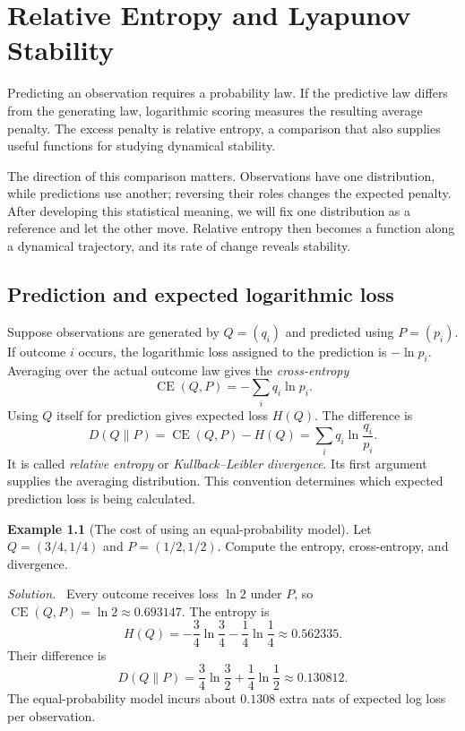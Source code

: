 \documentclass[11pt,oneside,openany]{book}
\theoremstyle{definition}
\newtheorem{example}{Example}[chapter]
\theoremstyle{remark}
\newenvironment{solution}{\par\smallskip\noindent\textit{Solution.}\ }{\par\smallskip}
\numberwithin{equation}{chapter}
\begin{document}
\mainmatter
\setcounter{chapter}{5}
\chapter{Relative Entropy and Lyapunov Stability}
\label{ch:kl}

Predicting an observation requires a probability law. If the predictive law differs from the generating law, logarithmic scoring measures the resulting average penalty. The excess penalty is relative entropy, a comparison that also supplies useful functions for studying dynamical stability.

The direction of this comparison matters. Observations have one distribution, while predictions use another; reversing their roles changes the expected penalty. After developing this statistical meaning, we will fix one distribution as a reference and let the other move. Relative entropy then becomes a function along a dynamical trajectory, and its rate of change reveals stability.

\section{Prediction and expected logarithmic loss}
Suppose observations are generated by $Q=(q_i)$ and predicted using $P=(p_i)$. If outcome $i$ occurs, the logarithmic loss assigned to the prediction is $-\ln p_i$. Averaging over the actual outcome law gives the \emph{cross-entropy}
\[
\operatorname{CE}(Q,P)=-\sum_iq_i\ln p_i.
\]
Using $Q$ itself for prediction gives expected loss $H(Q)$. The difference is
\begin{equation}\label{eq:kl}
\boxed{D(Q\|P)=\operatorname{CE}(Q,P)-H(Q)
=\sum_iq_i\ln\frac{q_i}{p_i}.}
\end{equation}
It is called \emph{relative entropy} or \emph{Kullback--Leibler divergence}. Its first argument supplies the averaging distribution. This convention determines which expected prediction loss is being calculated.

\begin{example}[The cost of using an equal-probability model]
Let $Q=(3/4,1/4)$ and $P=(1/2,1/2)$. Compute the entropy, cross-entropy, and divergence.
\begin{solution}
Every outcome receives loss $\ln2$ under $P$, so $\operatorname{CE}(Q,P)=\ln2\approx0.693147$. The entropy is
\[
H(Q)=-\frac34\ln\frac34-\frac14\ln\frac14\approx0.562335.
\]
Their difference is
\[
D(Q\|P)=\frac34\ln\frac32+\frac14\ln\frac12\approx0.130812.
\]
The equal-probability model incurs about $0.1308$ extra nats of expected log loss per observation.
\end{solution}
\end{example}
\end{document}
